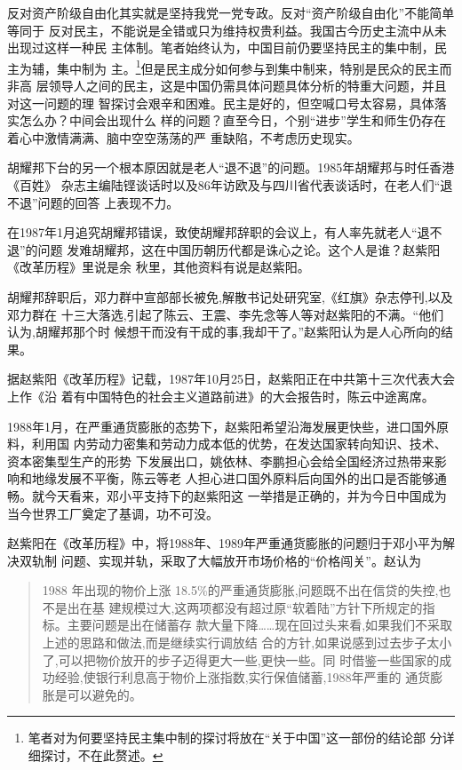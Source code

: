 反对资产阶级自由化其实就是坚持我党一党专政。反对“资产阶级自由化”不能简单等同于
反对民主，不能说是全错或只为维持权贵利益。我国古今历史主流中从未出现过这样一种民
主体制。笔者始终认为，中国目前仍要坚持民主的集中制，民主为辅，集中制为
主。\footnote{笔者对为何要坚持民主集中制的探讨将放在“关于中国”这一部份的结论部
  分详细探讨，不在此赘述。}但是民主成分如何参与到集中制来，特别是民众的民主而非高
层领导人之间的民主，这是中国仍需具体问题具体分析的特重大问题，并且对这一问题的理
智探讨会艰辛和困难。民主是好的，但空喊口号太容易，具体落实怎么办？中间会出现什么
样的问题？直至今日，个别“进步”学生和师生仍存在着心中激情满满、脑中空空荡荡的严
重缺陷，不考虑历史现实。

胡耀邦下台的另一个根本原因就是老人“退不退”的问题。1985年胡耀邦与时任香港《百姓》
杂志主编陆铿谈话时以及86年访欧及与四川省代表谈话时，在老人们“退不退”问题的回答
上表现不力。

在1987年1月追究胡耀邦错误，致使胡耀邦辞职的会议上，有人率先就老人“退不退”的问题
发难胡耀邦，这在中国历朝历代都是诛心之论。这个人是谁？赵紫阳《改革历程》里说是余
秋里，其他资料有说是赵紫阳。

胡耀邦辞职后，邓力群中宣部部长被免,解散书记处研究室,《红旗》杂志停刊,以及邓力群在
十三大落选,引起了陈云、王震、李先念等人等对赵紫阳的不满。“他们认为,胡耀邦那个时
候想干而没有干成的事,我却干了。”赵紫阳认为是人心所向的结果。

据赵紫阳《改革历程》记载，1987年10月25日，赵紫阳正在中共第十三次代表大会上作《沿
着有中国特色的社会主义道路前进》的大会报告时，陈云中途离席。

1988年1月，在严重通货膨胀的态势下，赵紫阳希望沿海发展更快些，进口国外原料，利用国
内劳动力密集和劳动力成本低的优势，在发达国家转向知识、技术、资本密集型生产的形势
下发展出口，姚依林、李鹏担心会给全国经济过热带来影响和地缘发展不平衡，陈云等老
人担心进口国外原料后向国外的出口是否能够通畅。就今天看来，邓小平支持下的赵紫阳这
一举措是正确的，并为今日中国成为当今世界工厂奠定了基调，功不可没。

赵紫阳在《改革历程》中，将1988年、1989年严重通货膨胀的问题归于邓小平为解决双轨制
问题、实现并轨，采取了大幅放开市场价格的“价格闯关”。赵认为
\begin{quotation}
  1988 年出现的物价上涨 18.5\%的严重通货膨胀,问题既不出在信贷的失控,也不是出在基
  建规模过大,这两项都没有超过原“软着陆”方针下所规定的指标。主要问题是出在储蓄存
  款大量下降……现在回过头来看,如果我们不采取上述的思路和做法,而是继续实行调放结
  合的方针,如果说感到过去步子太小了,可以把物价放开的步子迈得更大一些,更快一些。同
  时借鉴一些国家的成功经验,使银行利息高于物价上涨指数,实行保值储蓄,1988年严重的
  通货膨胀是可以避免的。
\end{quotation}

